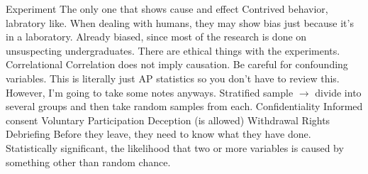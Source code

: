\markdownRendererUlItem Experiment\markdownRendererInterblockSeparator
{}\markdownRendererUlBeginTight
\markdownRendererUlItem The only one that shows cause and effect\markdownRendererUlItemEnd 
\markdownRendererUlItem Contrived behavior, labratory like.\markdownRendererUlItemEnd 
\markdownRendererUlItem When dealing with humans, they may show bias just because it's in a laboratory.\markdownRendererUlItemEnd 
\markdownRendererUlItem Already biased, since most of the research is done on unsuspecting undergraduates.\markdownRendererUlItemEnd 
\markdownRendererUlItem There are ethical things with the experiments.\markdownRendererUlItemEnd 
\markdownRendererUlEndTight \markdownRendererUlItemEnd 
\markdownRendererUlItem Correlational\markdownRendererInterblockSeparator
{}\markdownRendererUlBeginTight
\markdownRendererUlItem Correlation does not imply causation.\markdownRendererUlItemEnd 
\markdownRendererUlItem Be careful for confounding variables.\markdownRendererUlItemEnd 
\markdownRendererUlEndTight \markdownRendererUlItemEnd 
\markdownRendererUlEndTight \markdownRendererInterblockSeparator
{}\markdownRendererInterblockSeparator
{}This is literally just AP statistics so you don't have to review this. However, I'm going to take some notes anyways.\markdownRendererInterblockSeparator
{}\markdownRendererUlBeginTight
\markdownRendererUlItem Stratified sample $\rightarrow$ divide into several groups and then take random samples from each.\markdownRendererUlItemEnd 
\markdownRendererUlEndTight \markdownRendererInterblockSeparator
{}\markdownRendererInterblockSeparator
{}\markdownRendererUlBegin
\markdownRendererUlItem Confidentiality\markdownRendererUlItemEnd 
\markdownRendererUlItem Informed consent\markdownRendererUlItemEnd 
\markdownRendererUlItem Voluntary Participation\markdownRendererUlItemEnd 
\markdownRendererUlItem Deception (is allowed)\markdownRendererUlItemEnd 
\markdownRendererUlItem Withdrawal Rights\markdownRendererUlItemEnd 
\markdownRendererUlItem Debriefing\markdownRendererInterblockSeparator
{}\markdownRendererUlBeginTight
\markdownRendererUlItem Before they leave, they need to know what they have done.\markdownRendererUlItemEnd 
\markdownRendererUlEndTight \markdownRendererUlItemEnd 
\markdownRendererUlItem Statistically significant, the likelihood that two or more variables is caused by something other than random chance.\markdownRendererUlItemEnd 
\markdownRendererUlEnd \markdownRendererInterblockSeparator
{}\markdownRendererInterblockSeparator
